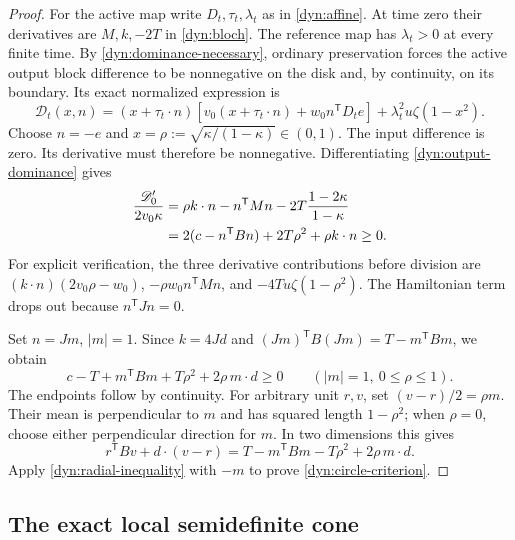 \documentclass[reqno]{amsart}
\theoremstyle{definition}
\theoremstyle{remark}
\begin{document}
\begin{proof}
For the active map write $D_t,\tau_t,\lambda_t$ as in
\eqref{dyn:affine}.  At time zero their derivatives are $M,k,-2T$ in
\eqref{dyn:bloch}.  The reference map has $\lambda_t>0$ at every finite
time.  By \eqref{dyn:dominance-necessary}, ordinary preservation forces
the active output block difference to be nonnegative on the disk and,
by continuity, on its boundary.  Its exact normalized expression is
\begin{equation}\label{dyn:output-dominance}
 \mathscr D_t(x,n)=
 (x+\tau_t\cdot n)
 [v_0(x+\tau_t\cdot n)+w_0n^{\mathsf T}D_te]
 +\lambda_t^2u\zeta(1-x^2).
\end{equation}
Choose $n=-e$ and $x=\rho:=\sqrt{\kappa/(1-\kappa)}\in(0,1)$.
The input difference is zero.  Its derivative must therefore be
nonnegative.  Differentiating \eqref{dyn:output-dominance} gives
\begin{align}\label{dyn:derivative-dominance}
 \frac{\mathscr D'_0}{2v_0\kappa}
 &=\rho k\cdot n-n^{\mathsf T}Mn
      -2T\frac{1-2\kappa}{1-\kappa}\notag\\
 &=2(c-n^{\mathsf T}Bn)+2T\rho^2+\rho k\cdot n\ge0.
\end{align}
For explicit verification, the three derivative contributions before
division are $(k\cdot n)(2v_0\rho-w_0)$,
$-\rho w_0n^{\mathsf T}Mn$, and
$-4Tu\zeta(1-\rho^2)$.  The Hamiltonian term drops out because
$n^{\mathsf T}Jn=0$.

Set $n=Jm$, $|m|=1$.  Since $k=4Jd$ and
$(Jm)^{\mathsf T}B(Jm)=T-m^{\mathsf T}Bm$, we obtain
\begin{equation}\label{dyn:radial-inequality}
 c-T+m^{\mathsf T}Bm+T\rho^2+2\rho\,m\cdot d\ge0
 \qquad (|m|=1,\ 0\le\rho\le1).
\end{equation}
The endpoints follow by continuity.
For arbitrary unit $r,v$, set $(v-r)/2=\rho m$.
Their mean is perpendicular to $m$ and has squared length $1-\rho^2$;
when $\rho=0$, choose either perpendicular direction for $m$.
In two dimensions this gives
\[
 r^{\mathsf T}Bv+d\cdot(v-r)
 =T-m^{\mathsf T}Bm-T\rho^2+2\rho\,m\cdot d.
\]
Apply \eqref{dyn:radial-inequality} with $-m$ to prove
\eqref{dyn:circle-criterion}.
\end{proof}

\subsection{The exact local semidefinite cone}
\end{document}
